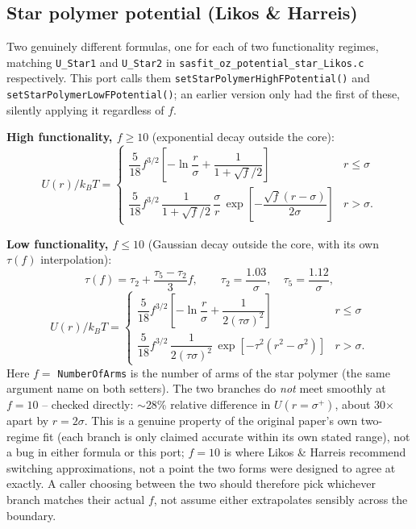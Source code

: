 \documentclass[11pt,a4paper]{article}
\newcommand{\code}[1]{\texttt{#1}}
\begin{document}
\subsection{Star polymer potential (Likos \& Harreis) \cite{likos2002}}
\label{sec:starpolymer}
Two genuinely different formulas, one for each of two functionality
regimes, matching \code{U\_Star1} and \code{U\_Star2} in
\code{sasfit\_oz\_potential\_star\_Likos.c} respectively. This port calls
them \code{setStarPolymerHigh\-FPotential()} and
\code{setStarPolymerLow\-FPotential()}; an earlier version only had the
first of these, silently applying it regardless of $f$.


\textbf{High functionality, $f\ge10$} (exponential decay outside the core):
\begin{equation}
  U(r)/k_BT =
  \begin{cases}
    \dfrac{5}{18}f^{3/2}\left[-\ln\!\dfrac{r}{\sigma}+\dfrac{1}{1+\sqrt{f}/2}\right] & r\le\sigma\\[2ex]
    \dfrac{5}{18}f^{3/2}\,\dfrac{1}{1+\sqrt{f}/2}\,\dfrac{\sigma}{r}\,
      \exp\!\left[-\dfrac{\sqrt{f}(r-\sigma)}{2\sigma}\right] & r>\sigma.
  \end{cases}
\end{equation}

\textbf{Low functionality, $f\le10$} (Gaussian decay outside the core, with
its own $\tau(f)$ interpolation):
\begin{equation}
  \tau(f) = \tau_2 + \frac{\tau_5-\tau_2}{3}f, \qquad
  \tau_2 = \frac{1.03}{\sigma}, \quad \tau_5 = \frac{1.12}{\sigma},
\end{equation}
\begin{equation}
  U(r)/k_BT =
  \begin{cases}
    \dfrac{5}{18}f^{3/2}\left[-\ln\!\dfrac{r}{\sigma}+\dfrac{1}{2(\tau\sigma)^2}\right] & r\le\sigma\\[2ex]
    \dfrac{5}{18}f^{3/2}\,\dfrac{1}{2(\tau\sigma)^2}\,
      \exp\!\left[-\tau^2(r^2-\sigma^2)\right] & r>\sigma.
  \end{cases}
\end{equation}
Here $f=$ \code{NumberOfArms} is the number of arms of the star polymer
(the same argument name on both setters). The two branches do \emph{not}
meet smoothly at $f=10$ -- checked directly: $\sim$28\% relative
difference in $U(r=\sigma^+)$, about 30$\times$ apart by $r=2\sigma$.
This is a genuine property of the original paper's own two-regime fit
(each branch is only claimed accurate within its own stated range), not
a bug in either formula or this port; $f=10$ is where Likos \& Harreis
recommend switching approximations, not a point the two forms were
designed to agree at exactly. A caller choosing between the two should
therefore pick whichever branch matches their actual $f$, not assume
either extrapolates sensibly across the boundary.
\end{document}
